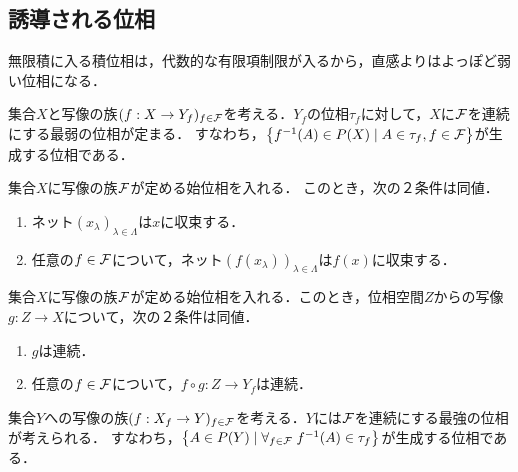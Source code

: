 \documentclass[uplatex,dvipdfmx]{jsreport}
\begin{document}
\subsection{誘導される位相}

\begin{tcolorbox}[colframe=ForestGreen, colback=ForestGreen!10!white,breakable,colbacktitle=ForestGreen!40!white,coltitle=black,fonttitle=\bfseries\sffamily,
title=]
    無限積に入る積位相は，代数的な有限項制限が入るから，直感よりはよっぽど弱い位相になる．
\end{tcolorbox}

\begin{definition}
    集合$X$と写像の族$(f:X\to Y_f)_{f\in\mathcal{F}}$を考える．$Y_f$の位相$\tau_f$に対して，$X$に$\mathcal{F}$を連続にする最弱の位相が定まる．
    すなわち，$\left\{f^{-1}(A)\in P(X)\mid A\in\tau_f,f\in\mathcal{F}\right\}$が生成する位相である．
\end{definition}

\begin{proposition}\label{prop-net-in-initial-topology}
    集合$X$に写像の族$\mathcal{F}$が定める始位相を入れる．
    このとき，次の２条件は同値．
    \begin{enumerate}
        \item ネット$(x_\lambda)_{\lambda\in\Lambda}$は$x$に収束する．
        \item 任意の$f\in\mathcal{F}$について，ネット$(f(x_\lambda))_{\lambda\in\Lambda}$は$f(x)$に収束する．
    \end{enumerate}
\end{proposition}

\begin{corollary}\label{cor-continuous-function-to-initial-topology}
    集合$X$に写像の族$\mathcal{F}$が定める始位相を入れる．このとき，位相空間$Z$からの写像$g:Z\to X$について，次の２条件は同値．
    \begin{enumerate}
        \item $g$は連続．
        \item 任意の$f\in\mathcal{F}$について，$f\circ g:Z\to Y_f$は連続．
    \end{enumerate}
\end{corollary}

\begin{definition}
    集合$Y$への写像の族$(f:X_f\to Y)_{f\in\mathcal{F}}$を考える．$Y$には$\mathcal{F}$を連続にする最強の位相が考えられる．
    すなわち，$\left\{A\in P(Y)\mid\forall_{f\in\mathcal{F}}\;f^{-1}(A)\in\tau_f\right\}$が生成する位相である．
\end{definition}
\end{document}
